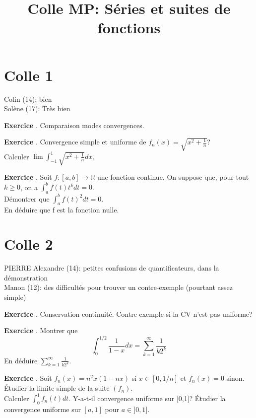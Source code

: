 \documentclass[10pt,a4paper]{article}
\title{Colle MP: Séries et suites de fonctions}
\newcounter{question}
\newcounter{exo}
\newenvironment{exo}{\vspace{0.5cm}\setcounter{question}{0}\addtocounter{exo}{1} \noindent \textbf{Exercice \theexo}. \normalsize }{\par}
\begin{document}
	\maketitle
	
	\section*{Colle 1}
	Colin (14): bien\\
	Solène (17): Très bien\\
	
	\begin{exo}
		Comparaison modes convergences.
	\end{exo}

	\begin{exo}
		Convergence simple et uniforme de $f_n(x) = \sqrt{x^2 + \frac{1}{n}}$?\\
		Calculer $\lim \int_{-1}^1 \sqrt{x^2 + \frac{1}{n}} dx$.
	\end{exo}

	\begin{exo}
		Soit $f:[a,b] \longrightarrow \mathbb{R}$ une fonction continue. On suppose que, pour tout $k\geq0$, on a $\int_a^b f(t)t^kdt=0$.\\
		Démontrer que $\int_a^bf(t)^2dt=0$.\\
		En déduire que f est la fonction nulle.		
	\end{exo}
	
	\section*{Colle 2}
	\setcounter{exo}{0}
	\noindent PIERRE Alexandre (14): petites confusions de quantificateurs, dans la démonstration \\
	Manon (12): des difficultés pour trouver un contre-exemple (pourtant assez simple)\\
	
	\begin{exo}
		Conservation continuité. Contre exemple si la CV n'est pas uniforme?
	\end{exo}
	
	\begin{exo}
		Montrer que $$\int_{0}^{1/2}\frac{1}{1-x} dx = \sum_{k=1}^{\infty} \frac{1}{k 2^k}$$
		En déduire $\sum_{k=1}^{\infty} \frac{1}{k 2^k}$.
	\end{exo}
	
	\begin{exo}
		Soit $f_n(x) = n^2 x (1 - nx)$ si $x \in [0,1/n]$ et $f_n(x)=0$ sinon.\\
		Étudier la limite simple de la suite $(f_n)$.\\
		Calculer $\int_0^1f_n(t)dt$. Y-a-t-il convergence uniforme sur [0,1]?
		Étudier la convergence uniforme sur $[a,1]$ pour $a \in ]0,1]$.
	\end{exo}
	
\end{document}
